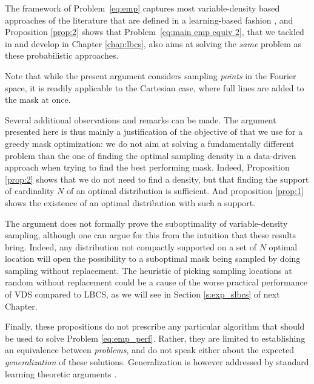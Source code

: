 The framework of Problem~\ref{eq:emp} captures most variable-density based approaches of the literature that are defined in a learning-based fashion \citep{knoll2011adapted,ravishankar2011adaptive,vellagoundar2015robust,haldar2019oedipus,bahadir2019learning,sherry2019learning}, and Proposition \ref{prop:2} shows that Problem~\ref{eq:main emp equiv 2}, that we tackled in \citet{gozcu2018learning,gozcu2019rethinking,sanchez2019scalable} and develop in Chapter \ref{chap:lbcs}, also aims at solving the \textit{same} problem as these probabilistic approaches. 

Note that while the present argument considers sampling \textit{points} in the Fourier space, it is readily applicable to the Cartesian case, where full lines are added to the mask at once.

Several additional observations and remarks can be made. The argument presented here is thus mainly a justification of the objective of  that we use for a greedy mask optimization: we do not aim at solving a fundamentally different problem than the one of finding the optimal sampling density in a data-driven approach when trying to find the best performing mask. Indeed, Proposition \ref{prop:2} shows that we do not need to find a density, but that finding the support of cardinality $N$ of an optimal distribution is sufficient. And proposition \ref{prop:1} shows the existence of an optimal distribution with such a support. 

The argument does not formally prove the suboptimality of variable-density sampling, although one can argue for this from the intuition that these results bring. Indeed, any distribution not compactly supported on a set of $N$ optimal location will open the possibility to a suboptimal mask being sampled by doing sampling without replacement. The heuristic of picking sampling locations at random without replacement could be a cause of the worse practical performance of VDS compared to LBCS, as we will see in Section \ref{s:exp_slbcs} of next Chapter.

Finally, these propositions do not prescribe any particular algorithm that should be used to solve Problem \ref{eq:emp_perf}. Rather, they are limited to establishing an equivalence between \textit{problems}, and do not speak either about the expected \textit{generalization} of these solutions. Generalization is however addressed by standard learning theoretic arguments \citep{gozcu2018learning}. 


